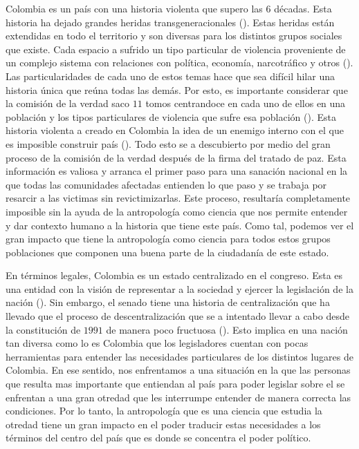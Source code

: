 \documentclass[12pt]{exam}
\begin{document}
Colombia es un país con una historia violenta que supero las 6 décadas. Esta historia ha dejado grandes heridas transgeneracionales (\cite{tomo1}). Estas heridas están extendidas en todo el territorio y son diversas para los distintos grupos sociales que existe. Cada espacio a sufrido un tipo particular de violencia proveniente de un complejo sistema con relaciones con política, economía, narcotráfico y otros (\cite{tomo1}). Las particularidades de cada uno de estos temas hace que sea difícil hilar una historia única que reúna todas las demás. Por esto, es importante considerar que la comisión de la verdad saco $11$ tomos centrandoce en cada uno de ellos en una población y los tipos particulares de violencia que sufre esa población (\cite{tomos}). Esta historia violenta a creado en Colombia la idea de un enemigo interno con el que es imposible construir país (\cite{tomo1}). Todo esto se a descubierto por medio del gran proceso de la comisión de la verdad después de la firma del tratado de paz. Esta información es valiosa y arranca el primer paso para una sanación nacional en la que todas las comunidades afectadas entienden lo que paso y se trabaja por resarcir a las victimas sin revictimizarlas. Este proceso, resultaría completamente imposible sin la ayuda de la antropología como ciencia que nos permite entender y dar contexto humano a la historia que tiene este país. Como tal, podemos ver el gran impacto que tiene la antropología como ciencia para todos estos grupos poblaciones que componen una buena parte de la ciudadanía de este estado.

En términos legales, Colombia es un estado centralizado en el congreso. Esta es una entidad con la visión de representar a la sociedad y ejercer la legislación de la nación (\cite{senadoMisionVision}). Sin embargo, el senado tiene una historia de centralización que ha llevado que el proceso de descentralización que se a intentado llevar a cabo desde la constitución de $1991$ de manera poco fructuosa (\cite{centro}). Esto implica en una nación tan diversa como lo es Colombia que los legisladores cuentan con pocas herramientas para entender las necesidades particulares de los distintos lugares de Colombia. En ese sentido, nos enfrentamos a una situación en la que las personas que resulta mas importante que entiendan al país para poder legislar sobre el se enfrentan a una gran otredad que les interrumpe entender de manera correcta las condiciones. Por lo tanto, la antropología que es una ciencia que estudia la otredad tiene un gran impacto en el poder traducir estas necesidades a los términos del centro del país que es donde se concentra el poder político.
\end{document}
